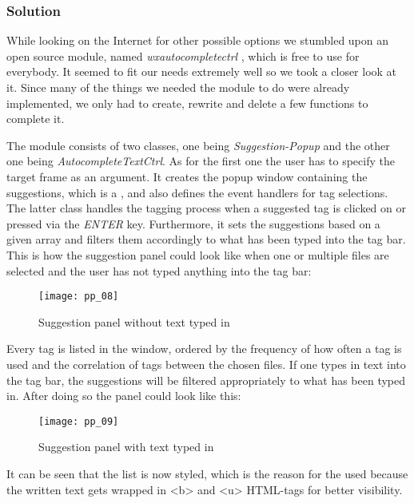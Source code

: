 \subsubsection{Solution}

While looking on the Internet for other possible options we stumbled upon an open source module, named \emph{wxautocompletectrl} \cite{autocomplete}, which is free to use for everybody. It seemed to fit our needs extremely well so we took a closer look at it. Since many of the things we needed the module to do were already implemented, we only had to create, rewrite and delete a few functions to complete it. 

The module consists of two classes, one being \textit{Suggestion-Popup} and the other one being \textit{AutocompleteTextCtrl}. As for the first one the user has to specify the target frame as an argument. It creates the popup window containing the suggestions, which is a  \cite{wxhtmllistbox}, and also defines the event handlers for tag selections. The latter class handles the tagging process when a suggested tag is clicked on or pressed via the \textit{ENTER} key. Furthermore, it sets the suggestions based on a given array and filters them accordingly to what has been typed into the tag bar.
This is how the suggestion panel could look like when one or multiple files are selected and the user has not typed anything into the tag bar:

\begin{figure}[H]
    \centering
    \texttt{[image: pp\_08]}
    \caption{Suggestion panel without text typed in}
\end{figure}

Every tag is listed in the window, ordered by the frequency of how often a tag is used and the correlation of tags between the chosen files. If one types in text into the tag bar, the suggestions will be filtered appropriately to what has been typed in. After doing so the panel could look like this:

\begin{figure}[H]
    \centering
    \texttt{[image: pp\_09]}
    \caption{Suggestion panel with text typed in}
\end{figure}

It can be seen that the list is now styled, which is the reason for the used  because the written text gets wrapped in <b> and <u> HTML-tags for better visibility.


